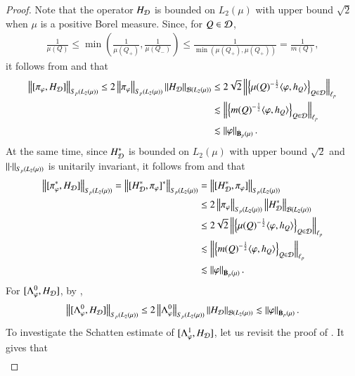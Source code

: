 \documentclass[leqno]{amsart}
\begin{document}
\begin{proof}
Note that the operator $H_{{\mathcal D}}$ is bounded on $L_{2}(\mu)$ with upper bound $\sqrt{2}$ when $\mu$ is a positive Borel measure. Since, for $Q\in{\mathcal D}$,
\begin{align*}
\frac{1}{\mu(Q)}\leq\min(\frac{1}{\mu(Q_{+})},\frac{1}{\mu(Q_{-})})
\leq\frac{1}{\min(\mu(Q_{+}),\mu(Q_{+}))}=\frac{1}{m(Q)},
\end{align*}
it follows from  and  that
\begin{align*}
\left\| [\pi_{\varphi},H_{{\mathcal D}}] \right\|_{S_{p}(L_{2}(\mu))}
\leq2\left\| \pi_{\varphi} \right\|_{S_{p}(L_{2}(\mu))}\left\| H_{{\mathcal D}} \right\|_{{\mathcal B}(L_{2}(\mu))}
&\leq2\sqrt{2}\left\| \left\{ \mu(Q)^{-\frac{1}{2}}\langle \varphi,h_{Q} \rangle \right\}_{Q\in{\mathcal D}} \right\|_{\ell_{p}}\\
&\lesssim\left\| \left\{ m(Q)^{-\frac{1}{2}}\langle \varphi,h_{Q} \rangle \right\}_{Q\in{\mathcal D}} \right\|_{\ell_{p}}\\
&\lesssim\left\| \varphi \right\|_{\dot{\mathbf B}_{p}(\mu)}.
\end{align*} 
At the same time, since $H_{{\mathcal D}}^{*}$ is bounded on $L_{2}(\mu)$ with upper bound $\sqrt{2}$ and $\left\| \cdot \right\|_{S_{p}(L_{2}(\mu))}$ is unitarily invariant,  it follows from  and  that
\begin{align*}
\left\| [\pi_{\varphi}^{*},H_{{\mathcal D}}] \right\|_{S_{p}(L_{2}(\mu))}
=\left\| [H_{{\mathcal D}}^{*},\pi_{\varphi}]^{*} \right\|_{S_{p}(L_{2}(\mu))}
&=\left\| [H_{{\mathcal D}}^{*},\pi_{\varphi}] \right\|_{S_{p}(L_{2}(\mu))}\\
&\leq2\left\| \pi_{\varphi} \right\|_{S_{p}(L_{2}(\mu))}\left\| H_{{\mathcal D}}^{*} \right\|_{{\mathcal B}(L_{2}(\mu))}\\
&\leq2\sqrt{2}\left\| \left\{ \mu(Q)^{-\frac{1}{2}}\langle \varphi,h_{Q} \rangle \right\}_{Q\in{\mathcal D}} \right\|_{\ell_{p}}\\
&\lesssim\left\| \left\{ m(Q)^{-\frac{1}{2}}\langle \varphi,h_{Q} \rangle \right\}_{Q\in{\mathcal D}} \right\|_{\ell_{p}}\\
&\lesssim\left\| \varphi \right\|_{\dot{\mathbf B}_{p}(\mu)}.
\end{align*} 
For $[\Lambda^{0}_{\varphi},H_{{\mathcal D}}]$, by ,
\begin{align*}
\left\| [\Lambda^{0}_{\varphi},H_{{\mathcal D}}] \right\|_{S_{p}(L_{2}(\mu))}
\leq2\left\| \Lambda^{0}_{\varphi} \right\|_{S_{p}(L_{2}(\mu))}\left\| H_{{\mathcal D}} \right\|_{{\mathcal B}(L_{2}(\mu))}
\lesssim\left\| \varphi \right\|_{\dot{\mathbf B}_{p}(\mu)}.
\end{align*} 
To investigate the Schatten estimate of $[\Lambda^{1}_{\varphi},H_{{\mathcal D}}]$, let us revisit the proof of . It gives that 
\begin{align*}

\end{align*}
\end{proof}
\end{document}
